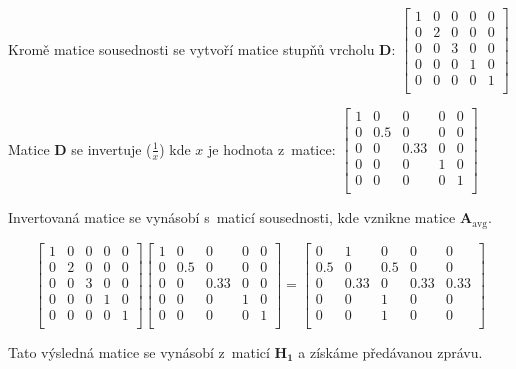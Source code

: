 Kromě matice sousednosti se vytvoří matice stupňů vrcholu $\mathbf{D}$:
$\left[ \begin{matrix}
1 & 0 & 0 & 0 & 0 \\
0 & 2 & 0 & 0 & 0 \\
0 & 0 & 3 & 0 & 0 \\
0 & 0 & 0 & 1 & 0 \\
0 & 0 & 0 & 0 & 1 \\
\end{matrix} \right]$

Matice $\mathbf{D}$ se invertuje ($\frac{1}{x}$) kde $x$ je hodnota z~matice:
$\left[ \begin{matrix}
1 & 0 & 0 & 0 & 0 \\
0 & 0.5 & 0 & 0 & 0 \\
0 & 0 & 0.33 & 0 & 0 \\
0 & 0 & 0 & 1 & 0 \\
0 & 0 & 0 & 0 & 1 \\
\end{matrix} \right]$

Invertovaná matice se vynásobí s~maticí sousednosti, kde vznikne matice $\mathbf{A_\mathrm{avg}}$.

$$
\left[ \begin{matrix}
1 & 0 & 0 & 0 & 0 \\
0 & 2 & 0 & 0 & 0 \\
0 & 0 & 3 & 0 & 0 \\
0 & 0 & 0 & 1 & 0 \\
0 & 0 & 0 & 0 & 1 \\
\end{matrix} \right]
\left[ \begin{matrix}
1 & 0 & 0 & 0 & 0 \\
0 & 0.5 & 0 & 0 & 0 \\
0 & 0 & 0.33 & 0 & 0 \\
0 & 0 & 0 & 1 & 0 \\
0 & 0 & 0 & 0 & 1 \\
\end{matrix} \right] =
\left[ \begin{matrix}
0 & 1 & 0 & 0 & 0 \\
0.5 & 0 & 0.5 & 0 & 0 \\
0 & 0.33 & 0 & 0.33 & 0.33 \\
0 & 0 & 1 & 0 & 0 \\
0 & 0 & 1 & 0 & 0 \\
\end{matrix} \right]
$$

Tato výsledná matice se vynásobí z~maticí $\mathbf{H_1}$ a získáme předávanou zprávu.

